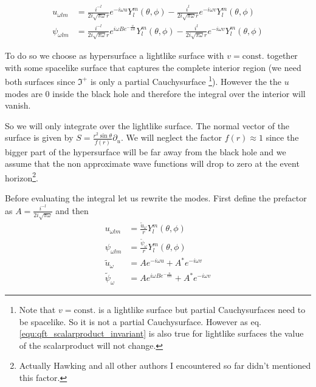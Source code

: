 \begin{align}
u_{\omega l m} &= \frac{i^{-l}}{2i\sqrt{\pi\omega}r} e^{-i\omega u} Y_l^m (\theta, \phi) - \frac{i^{l}}{2i\sqrt{\pi\omega}r} e^{-i\omega v} Y_l^m (\theta, \phi)\\
\psi_{\omega l m} &= \frac{i^{-l}}{2i\sqrt{\pi\omega}r} e^{i\omega B e^{-\frac{u}{4M}}} Y_l^m (\theta, \phi) - \frac{i^{l}}{2i\sqrt{\pi\omega}r} e^{-i\omega v} Y_l^m (\theta, \phi)
\end{align}

To do so we choose as hypersurface a lightlike surface with \(v = \mathrm{const}.\) together with some spacelike surface that captures the complete interior region (we need both surfaces since \(\Im^+\) is only a partial Cauchysurface \footnote{Note that \(v = \mathrm{const}.\) is a lightlike surface but partial Cauchysurfaces need to be spacelike. So it is not a partial Cauchysurface. However as eq. \ref{equ:qft_scalarproduct_invariant} is also true for lightlike surfaces the value of the scalarproduct will not change.}). However the the \(u\) modes are \(0\) inside the black hole and therefore the integral over the interior will vanish.

So we will only integrate over the lightlike surface. The normal vector of the surface is given by \(S = \frac{r^2 \sin\theta}{f(r)} \partial_u\). We will neglect the factor \(f(r) \approx 1\) since the bigger part of the hypersurface will be far away from the black hole and we assume that the non approximate wave functions will drop to zero at the event horizon\footnote{Actually Hawking and all other authors I encountered so far didn't mentioned this factor.}.

Before evaluating the integral let us rewrite the modes. First define the prefactor as \(A = \frac{i^{-l}}{2i\sqrt{\pi\omega}}\) and then  
\begin{align}
u_{\omega l m} &= \frac{\tilde{u}_\omega}{r} Y_l^m (\theta, \phi)\\
\psi_{\omega l m} &= \frac{\tilde{\psi}_\omega}{r} Y_l^m (\theta, \phi)\\
\tilde{u}_{\omega} &= A e^{-i\omega u} + A^* e^{-i\omega v}\\
\tilde{\psi}_{\omega} &= A e^{i\omega B e^{-\frac{u}{4M}}} + A^* e^{-i\omega v}
\end{align}

